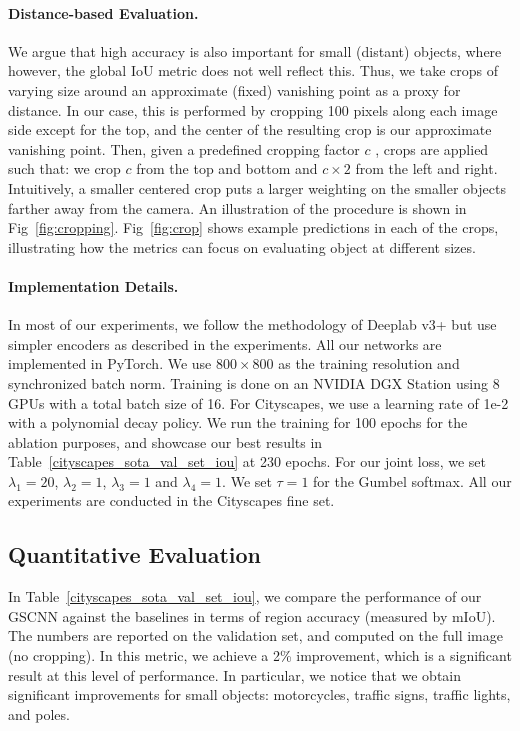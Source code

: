 \documentclass[10pt,twocolumn,letterpaper]{article}
\begin{document}
\paragraph{Distance-based Evaluation.}
We argue that high accuracy is also important for small (distant) objects, where however, the global IoU metric does not well reflect this. 
Thus, we take crops of varying size around an approximate (fixed) vanishing point as a proxy for distance. 
In our case, this is performed by cropping 100 pixels along each image side except for the top, and the center of the resulting crop is our approximate  vanishing point.
Then, given a predefined cropping factor $c$
, crops are applied such that:  we crop $c $ from the top and bottom and $c\times 2$ from the left and right. 
Intuitively,  a smaller centered crop puts a larger weighting on the smaller objects farther away from the camera. 
An illustration of the procedure is shown in Fig~\ref{fig:cropping}. Fig~\ref{fig:crop} shows example predictions in each of the crops, illustrating how the metrics can focus on evaluating object at different sizes. 
 
 \vspace{-3mm}
 \paragraph{Implementation Details.}
In most of our experiments, we follow the methodology of Deeplab v3+ \cite{deeplabv3plus2018} but use simpler encoders as described in the experiments. 
All our networks are implemented in PyTorch. 
We use  $800 \times 800$ as the training resolution and synchronized batch norm. Training is done on an NVIDIA DGX Station using 8 GPUs with a total batch size of 16.
For Cityscapes, we use a learning rate of 1e-2 with a polynomial decay policy. 
We run the training for 100 epochs for the ablation purposes, and showcase our best results in Table~\ref{cityscapes_sota_val_set_iou} at 230 epochs. 
For our joint loss, we set $\lambda_1 = 20$, $\lambda_2 = 1$, $\lambda_3 = 1$ and $\lambda_4 = 1$. We set $\tau = 1$ for the Gumbel softmax.
All our experiments are conducted in the Cityscapes fine set.

\subsection{Quantitative Evaluation}

In Table~\ref{cityscapes_sota_val_set_iou}, we compare the performance of our GSCNN against the baselines in terms of region accuracy (measured by mIoU). The numbers are reported on the validation set, and computed on the full image (no cropping). 
In this metric, we achieve a 2\% improvement, which is a significant result at this level of performance.
In particular, we notice that we obtain significant improvements for small objects:
motorcycles, traffic signs, traffic lights, and poles. 
\end{document}
